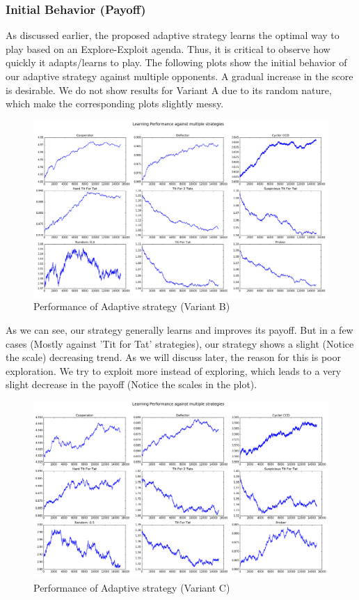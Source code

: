 \documentclass[a4paper]{article}
\begin{document}
	\subsubsection{Initial Behavior (Payoff)}

	As discussed earlier, the proposed adaptive strategy learns the optimal way to play based on an Explore-Exploit agenda. Thus, it is critical to observe how quickly it adapts/learns to play. The following plots show the initial behavior of our adaptive strategy against multiple opponents. A gradual increase in the score is desirable. We do not show results for Variant A due to its random nature, which make the corresponding plots slightly messy.\\

	\begin{figure}[H]
	\centering
	\includegraphics[width=\textwidth]{learnerInitialB.png}
	\caption{{Performance of Adaptive strategy (Variant B)}}
	\end{figure}

	As we can see, our strategy generally learns and improves its payoff. But in a few cases (Mostly against 'Tit for Tat' strategies), our strategy shows a slight (Notice the scale) decreasing trend. As we will discuss later, the reason for this is poor exploration. We try to exploit more instead of exploring, which leads to a very slight decrease in the payoff (Notice the scales in the plot).

	\begin{figure}[H]
	\centering
	\includegraphics[width=\textwidth]{learnerInitialC_b8.png}
	\caption{{Performance of Adaptive strategy (Variant C)}}
	\end{figure}
\end{document}
